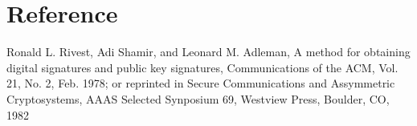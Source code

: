 \documentclass[12]{article}
\begin{document}
\section{Reference}


Ronald L. Rivest, Adi Shamir, and Leonard M. Adleman, A method for obtaining digital signatures and public key signatures, Communications of the ACM, Vol. 21, No. 2, Feb. 1978; or reprinted in Secure Communications and Assymmetric Cryptosystems, AAAS Selected Synposium 69, Westview Press, Boulder, CO, 1982
\end{document}
